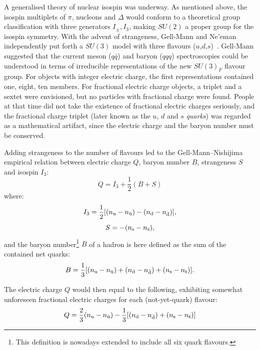 A generalised theory of nuclear isospin was underway. As
mentioned above, the isospin multiplets of $\pi$, nucleons and
$\Delta$ would conform to a theoretical group classification with
three generators $I_{\pm},I_3$, making $SU(2)$ a proper group for the
isospin symmetry. With the advent of strangeness, Gell-Mann and
Ne'eman independently put forth a $SU(3)$ model with three flavours
($u$,$d$,$s$)~\cite{eightfoldway,neeman}. Gell-Mann suggested that the
current meson ($q\bar{q}$) and baryon ($qqq$) spectroscopies could be
understood in terms of irreducible representations of the new $SU(3)_F$ flavour group. For objects with integer
electric charge, the first representations contained one, eight, ten
members. For fractional electric charge objects, a triplet and a
sextet were envisioned, but no particles with fractional charge were
found. People at that time did not take the existence of fractional
electric charges seriously, and the fractional charge triplet (later
known as the $u$, $d$ and $s$ \textit{quarks}) was regarded as a
mathematical artifact, since the electric charge and the baryon
number must be conserved. 

Adding strangeness to the number of flavours led to the
Gell-Mann--Nishijima empirical relation between electric charge $Q$,
baryon number $B$, strangeness $S$ and isospin $I_3$:
\begin{equation}
Q = I_3 + \frac{1}{2}(B + S) 
\end{equation}
where: 
\begin{equation}
I_3 = \frac{1}{2}[(n_{\rm u} - n_{\rm \bar{u}}) - (n_{\rm d} - n_{\rm
  \bar{d}})],
\end{equation}
\begin{equation}
S = -(n_{\rm s} - n_{\rm \bar{s}}), 
\end{equation}
and the baryon number\footnote{This definition
is nowadays extended to include all six quark flavours.} $B$ of a
hadron is here defined as the sum of the
contained net quarks:
\begin{equation}
B = \frac{1}{3}[(n_{\rm u} - n_{\rm \bar{u}}) + (n_{\rm d} - n_{\rm
  \bar{d}}) + (n_{\rm s} - n_{\rm \bar{s}}) ].
\end{equation}

The electric charge $Q$ would then equal to the following, exhibiting
somewhat unforeseen fractional electric charges for each
(not-yet-quark) flavour:
\begin{equation}
Q = \frac{2}{3}(n_{\rm u} - n_{\rm \bar{u}}) - \frac{1}{3}[(n_{\rm d} - n_{\rm
  \bar{d}})+(n_{\rm s} - n_{\rm \bar{s}})]
\end{equation}

